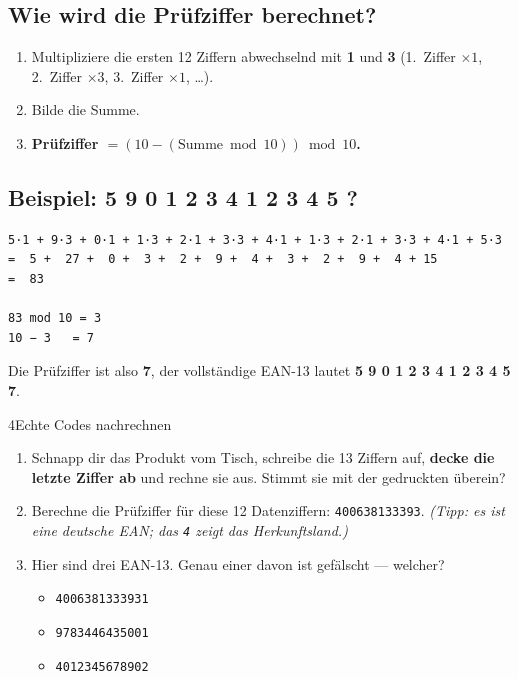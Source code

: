 \subsection*{Wie wird die Prüfziffer berechnet?}

\begin{enumerate}
\item Multipliziere die ersten 12 Ziffern abwechselnd mit \textbf{1}
  und \textbf{3} (1.\ Ziffer $\times 1$, 2.\ Ziffer $\times 3$,
  3.\ Ziffer $\times 1$, \dots).
\item Bilde die Summe.
\item \textbf{Prüfziffer $= (10 - (\text{Summe} \bmod 10)) \bmod 10$.}
\end{enumerate}

\subsection*{Beispiel: 5 9 0 1 2 3 4 1 2 3 4 5 ?}

\begin{verbatim}
5·1 + 9·3 + 0·1 + 1·3 + 2·1 + 3·3 + 4·1 + 1·3 + 2·1 + 3·3 + 4·1 + 5·3
=  5 +  27 +  0 +  3 +  2 +  9 +  4 +  3 +  2 +  9 +  4 + 15
=  83

83 mod 10 = 3
10 − 3   = 7
\end{verbatim}

Die Prüfziffer ist also \textbf{7}, der vollständige EAN-13 lautet
\textbf{5 9 0 1 2 3 4 1 2 3 4 5 7}.

\begin{bleistiftuebung}{4}{Echte Codes nachrechnen}
\begin{enumerate}[label=(\alph*), leftmargin=*]
\item Schnapp dir das Produkt vom Tisch, schreibe die 13 Ziffern auf,
  \textbf{decke die letzte Ziffer ab} und rechne sie aus. Stimmt sie
  mit der gedruckten überein?
\item Berechne die Prüfziffer für diese 12 Datenziffern:
  \texttt{400638133393}. \emph{(Tipp: es ist eine deutsche EAN; das
  \texttt{4} zeigt das Herkunftsland.)}
\item Hier sind drei EAN-13. Genau einer davon ist gefälscht — welcher?
  \begin{itemize}
  \item \texttt{4006381333931}
  \item \texttt{9783446435001}
  \item \texttt{4012345678902}
  \end{itemize}
\end{enumerate}
\end{bleistiftuebung}

